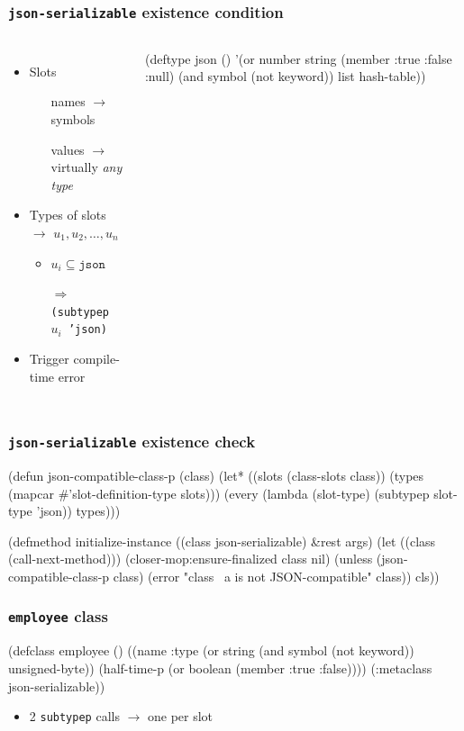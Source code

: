 \documentclass[aspectratio=169]{beamer}
\renewcommand\code[1]{\texttt{#1}}
\newcommand\rarr{\ensuremath{\rightarrow}}
\newcommand\Rarr{\ensuremath{\Rightarrow}}
\newcommand\tgood{{\color{watchOS-purple}\faThumbsOUp}}
\newcommand\tbad{{\color{watchOS-red}\faThumbsODown}}
\begin{document}
\begin{frame}[fragile]
  \frametitle{\code{json-serializable} existence condition}
  \begin{columns}
    \begin{itemize}
    \item Slots
      \begin{itemize}
      \item[\tgood] names \rarr{} symbols
      \item[\tbad] values \rarr{} virtually \emph{any type}
      \end{itemize}
    \item<3-> Types of slots \rarr{} $u_1, u_2, \dots, u_n$
      \begin{itemize}
      \item $u_i \subseteq \code{json}$
      \item[\Rarr{}] \code{(subtypep $u_i$ 'json)}
      \end{itemize}
    \item<3-> Trigger compile-time error
  \end{itemize}

\begin{clcode}
(deftype json ()
  '(or number
       string
       (member :true
               :false
               :null)
       (and symbol
            (not keyword))
       list
       hash-table))
\end{clcode}
  \end{columns}
\end{frame}

\begin{frame}[fragile]
  \frametitle{\code{json-serializable} existence check}
\begin{clcode}
(defun json-compatible-class-p (class)
  (let* ((slots (class-slots class))
         (types (mapcar #'slot-definition-type slots)))
    (every (lambda (slot-type)
             (subtypep slot-type 'json))
           types)))

(defmethod initialize-instance ((class json-serializable)
                                &rest args)
  (let ((class (call-next-method)))
    (closer-mop:ensure-finalized class nil)
    (unless (json-compatible-class-p class)
      (error "class ~a is not JSON-compatible" class))
    cls))
\end{clcode}
\end{frame}

\begin{frame}[fragile]
  \frametitle{\code{employee} class}
\begin{clcode}
(defclass employee ()
  ((name :type (or string
                   (and symbol
                        (not keyword))
                   unsigned-byte))
   (half-time-p (or boolean
                    (member :true
                            :false))))
  (:metaclass json-serializable))
\end{clcode}

  \pause
  \begin{itemize}
  \item 2 \code{subtypep} calls \rarr{} one per slot
  \end{itemize}
\end{frame}
\end{document}
